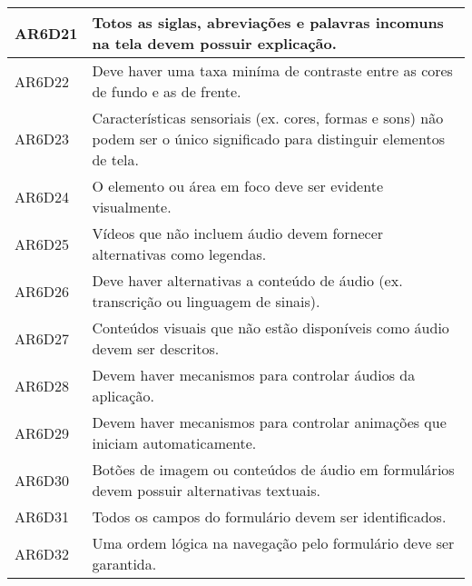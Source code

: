 \begin{table}[htb]
\begin{center}
\begin{tabular}{p{1.2cm}|p{13.5cm}}
      \hline
      AR6D21          & Totos as siglas, abreviações e palavras incomuns na tela devem possuir explicação.                                                           \\
      \hline
      AR6D22          & Deve haver uma taxa miníma de contraste entre as cores de fundo e as de frente.                                                              \\
      \hline
      AR6D23          & Características sensoriais (ex.\: cores, formas e sons) não podem ser o único significado para distinguir elementos de tela.                 \\
      \hline
      AR6D24          & O elemento ou área em foco deve ser evidente visualmente.                                                                                    \\
      \hline
      AR6D25          & Vídeos que não incluem áudio devem fornecer alternativas como legendas.                                                                      \\
      \hline
      AR6D26          & Deve haver alternativas a conteúdo de áudio (ex.\: transcrição ou linguagem de sinais).                                                      \\
      \hline
      AR6D27          & Conteúdos visuais que não estão disponíveis como áudio devem ser descritos.                                                                  \\
      \hline
      AR6D28          & Devem haver mecanismos para controlar áudios da aplicação.                                                                                   \\
      \hline
      AR6D29          & Devem haver mecanismos para controlar animações que iniciam automaticamente.                                                                 \\
      \hline
      AR6D30          & Botões de imagem ou conteúdos de áudio em formulários devem possuir alternativas textuais.                                                   \\
      \hline
      AR6D31          & Todos os campos do formulário devem ser identificados.                                                                                       \\
      \hline
      AR6D32          & Uma ordem lógica na navegação pelo formulário deve ser garantida.                                                                            \\

\end{tabular}
\end{center}
\end{table}
